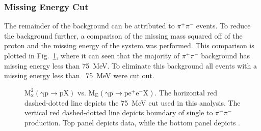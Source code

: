 \subsubsection{Missing Energy  Cut}
The remainder of the background can be attributed to $\pi^+\pi^-$ events. To reduce the background further, a comparison of the missing mass squared off of the proton and the missing energy of the system was performed. This comparison is plotted in Fig.~\ref{kinefit.mm2p.mE.data.MC}, where it can seen that the majority of $\pi^+\pi^-$ background has missing energy less than 75~MeV. To eliminate this background all events with a missing energy less than ~75~MeV were cut out.
\begin{figure}[h!]\begin{center}

\caption[$\mathrm{M_x^2(\gamma p \to p X)}$ vs. $\mathrm{M_E(\gamma p \to pe^+e^- X)}$]{\label{kinefit.mm2p.mE.data.MC}$\mathrm{M_x^2(\gamma p \to p X)}$ vs. $\mathrm{M_E(\gamma p \to pe^+e^- X)}$. The horizontal red dashed-dotted line depicts the 75~MeV cut used in this analysis. The vertical red dashed-dotted line depicts boundary of single \pizT to $\pi^+\pi^-$  production. Top panel depicts data, while the bottom panel depicts .}

\end{center}\end{figure}

